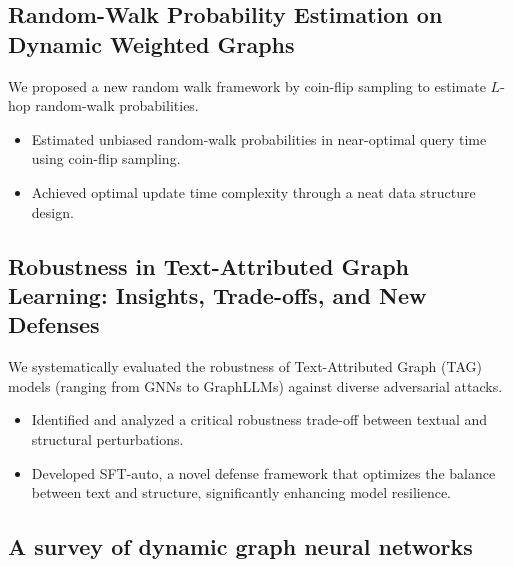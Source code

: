 \documentclass{resume}
\begin{document}
\subsection{\bf Random-Walk Probability Estimation on Dynamic Weighted Graphs} 

We proposed a new random walk framework by coin-flip sampling to estimate $L$-hop random-walk probabilities.
\begin{itemize}
  \item Estimated unbiased random-walk probabilities in near-optimal query time using coin-flip sampling.
  \item Achieved optimal update time complexity through a neat data structure design.
\end{itemize}

\subsection{\bf Robustness in Text-Attributed Graph Learning: Insights, Trade-offs, and New Defenses} 

We systematically evaluated the robustness of Text-Attributed Graph (TAG) models (ranging from GNNs to GraphLLMs) against diverse adversarial attacks.
\begin{itemize}  
  \item Identified and analyzed a critical robustness trade-off between textual and structural perturbations.
  \item Developed SFT-auto, a novel defense framework that optimizes the balance between text and structure, significantly enhancing model resilience.
\end{itemize}

\subsection{\bf A survey of dynamic graph neural networks} 
\end{document}
